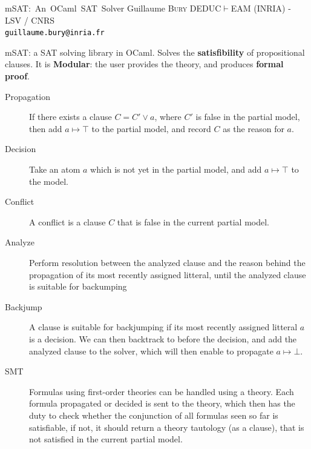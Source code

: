 \documentclass[portrait,a0,final]{a0poster}
\def\msat{\textsf{mSAT}}
\begin{document}
\sffamily %

\postertitle
{\msat{}:~An~OCaml~SAT~Solver}
{Guillaume \textsc{Bury}}
{DEDUC$\vdash$EAM (INRIA) - LSV / CNRS\\
\Large \textcolor{black}{\texttt{guillaume.bury@inria.fr}}}

\begin{center}

\begin{multicols}{2}

{
  \vspace{0.5cm} %

  \msat{}: a SAT solving library in OCaml. Solves the \textbf{satisfibility}
  of propositional clauses. It is \textbf{Modular}: the user provides
  the theory, and produces \textbf{formal proof}.
}

{
  \begin{description}
    \item[Propagation] If there exists a clause $C = C' \lor a$, where
      $C'$ is false in the partial model, then add $a \mapsto \top$ to
      the partial model, and record $C$ as the reason for $a$.
    \item[Decision] Take an atom $a$ which is not yet in the partial model,
      and add $a \mapsto \top$ to the model.
    \item[Conflict] A conflict is a clause $C$ that is false in the current partial
      model.
    \item[Analyze] Perform resolution between the analyzed clause and the reason
      behind the propagation of its most recently assigned litteral, until
      the analyzed clause is suitable for backumping
    \item[Backjump] A clause is suitable for backjumping if its most recently
      assigned litteral $a$ is a decision. We can then backtrack to before the
      decision, and add the analyzed clause to the solver, which will then enable
      to propagate $a \mapsto \bot$.
    \item[SMT] Formulas using first-order theories can be handled using a theory.
      Each formula propagated or decided is sent to the theory, which then
      has the duty to check whether the conjunction of all formulas seen so
      far is satisfiable, if not, it should return a theory tautology (as a clause),
      that is not satisfied in the current partial model.
  \end{description}
}


\end{multicols}
\end{center}
\end{document}
